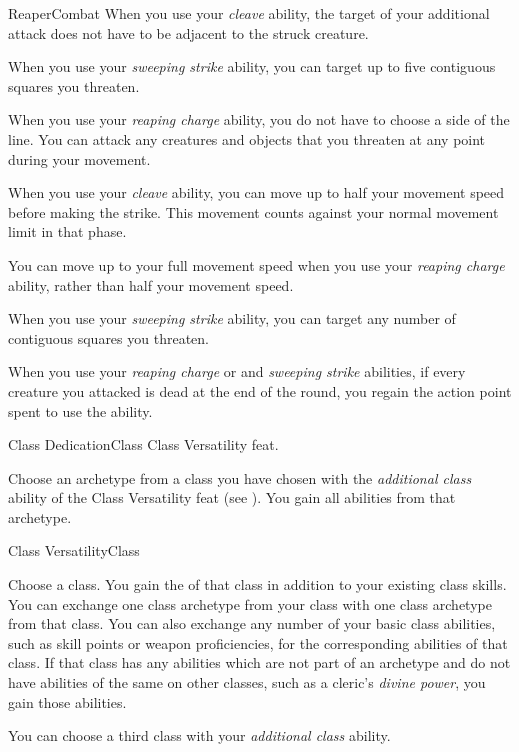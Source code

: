 \begin{feat}{Reaper}{Combat}
         When you use your \textit{cleave} ability, the target of your additional attack does not have to be adjacent to the struck creature.

         When you use your \textit{sweeping strike} ability, you can target up to five contiguous squares you threaten.

         When you use your \textit{reaping charge} ability, you do not have to choose a side of the line.
        You can attack any creatures and objects that you threaten at any point during your movement.

         When you use your \textit{cleave} ability, you can move up to half your movement speed before making the strike.
        This movement counts against your normal movement limit in that phase.

         You can move up to your full movement speed when you use your \textit{reaping charge} ability, rather than half your movement speed.

         When you use your \textit{sweeping strike} ability, you can target any number of contiguous squares you threaten.

         When you use your \textit{reaping charge} or and \textit{sweeping strike} abilities, if every creature you attacked is dead at the end of the round, you regain the action point spent to use the ability.
    \end{feat}

    \begin{feat}{Class Dedication}{Class}
        \featpre Class Versatility feat.
        \featben

         Choose an archetype from a class you have chosen with the \textit{additional class} ability of the Class Versatility feat (see ).
        You gain all abilities from that archetype.

    \end{feat}

    \begin{feat}{Class Versatility}{Class}
        \featben

         Choose a class.
        You gain the  of that class in addition to your existing class skills.
        You can exchange one class archetype from your class with one class archetype from that class.
        You can also exchange any number of your basic class abilities, such as skill points or weapon proficiencies, for the corresponding abilities of that class.
        If that class has any abilities which are not part of an archetype and do not have abilities of the same on other classes, such as a cleric's \textit{divine power}, you gain those abilities.

         You can choose a third class with your \textit{additional class} ability.
        
    \end{feat}

